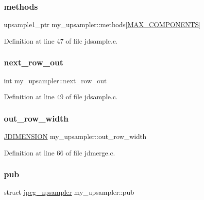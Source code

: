 \subsubsection{\texorpdfstring{methods}{methods}}
{\footnotesize\ttfamily upsample1\+\_\+ptr my\+\_\+upsampler\+::methods\mbox{[}\mbox{\hyperlink{jmorecfg_8h_a6d8c910a1fdb6d4762a05f7250e64322}{M\+A\+X\+\_\+\+C\+O\+M\+P\+O\+N\+E\+N\+TS}}\mbox{]}}



Definition at line 47 of file jdsample.\+c.

\mbox{\label{structmy__upsampler_a9e77765267bd21be6cb005b748034d76}} 
\subsubsection{\texorpdfstring{next\_row\_out}{next\_row\_out}}
{\footnotesize\ttfamily int my\+\_\+upsampler\+::next\+\_\+row\+\_\+out}



Definition at line 49 of file jdsample.\+c.

\mbox{\label{structmy__upsampler_a315364082734b3779abccc258a2954e8}} 
\subsubsection{\texorpdfstring{out\_row\_width}{out\_row\_width}}
{\footnotesize\ttfamily \mbox{\hyperlink{jmorecfg_8h_a04ed4674f6f1d0d50ec241531e38274f}{J\+D\+I\+M\+E\+N\+S\+I\+ON}} my\+\_\+upsampler\+::out\+\_\+row\+\_\+width}



Definition at line 66 of file jdmerge.\+c.

\mbox{\label{structmy__upsampler_a34dcee6f85a807bcacec127661432823}} 
\subsubsection{\texorpdfstring{pub}{pub}}
{\footnotesize\ttfamily struct \mbox{\hyperlink{structjpeg__upsampler}{jpeg\+\_\+upsampler}} my\+\_\+upsampler\+::pub}



